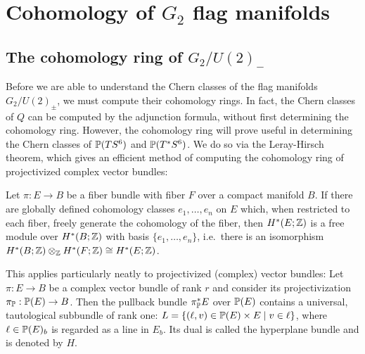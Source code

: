 

\section{Cohomology of \texorpdfstring{$G_2$}{G2} flag manifolds}

\subsection{The cohomology ring of \texorpdfstring{$G_2/U(2)_-$}{the quadric}}

Before we are able to understand the Chern classes of the flag manifolds $G_2/U(2)_\pm$, we must compute their cohomology rings. In fact, the Chern classes of $Q$ can be computed by the adjunction formula, without first determining the cohomology ring. However, the cohomology ring will prove useful in determining the Chern classes of $\P(TS^6)$ and $\P(T^*S^6)$. We do so via the Leray-Hirsch theorem, which gives an efficient method of computing the cohomology ring of projectivized complex vector bundles:

\begin{thm}
	Let $\pi:E\to B$ be a fiber bundle with fiber $F$ over a compact manifold $B$. If there are globally defined cohomology classes $e_1,\dots,e_n$ on $E$ which, when restricted to each fiber, freely generate the cohomology of the fiber, then $H^*(E;\Z)$ is a free module over $H^*(B;\Z)$ with basis $\{e_1,\dots,e_n\}$, i.e.~there is an isomorphism $H^*(B;\Z)\otimes_\Z H^*(F;\Z)\cong H^*(E;\Z)$.
\end{thm}

This applies particularly neatly to projectivized (complex) vector bundles: Let $\pi:E\to B$ be a complex vector bundle of rank $r$ and consider its projectivization $\pi_{\P}:\P(E)\to B$. Then the pullback bundle $\pi_{\P}^*E$ over $\P(E)$ contains a universal, tautological subbundle of rank one: $L=\{(\ell,v)\in \P(E)\times E\mid v\in \ell\}$, where $\ell\in\P(E)_b$ is regarded as a line in $E_b$. Its dual is called the hyperplane bundle and is denoted by $H$.

